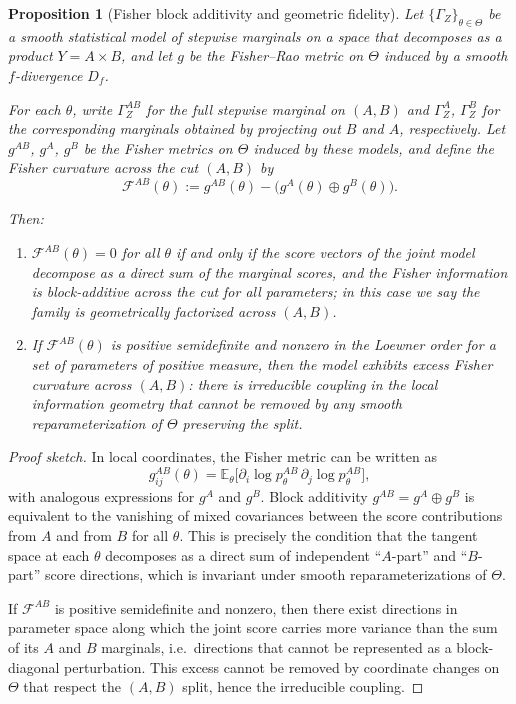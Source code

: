 \documentclass[11pt]{article}
\newtheorem{proposition}{Proposition}
\newcommand{\1}{\mathbf{1}}
\begin{document}
\begin{proposition}[Fisher block additivity and geometric fidelity]
\label{prop:fisher-block-additivity}
Let $\{\Gamma_Z\}_{\theta\in\Theta}$ be a smooth statistical model of stepwise marginals on a space that decomposes as a product $Y = A \times B$, and let $g$ be the Fisher--Rao metric on $\Theta$ induced by a smooth $f$-divergence $D_f$.

For each $\theta$, write $\Gamma_Z^{AB}$ for the full stepwise marginal on $(A,B)$ and $\Gamma_Z^A$, $\Gamma_Z^B$ for the corresponding marginals obtained by projecting out $B$ and $A$, respectively. Let $g^{AB}$, $g^A$, $g^B$ be the Fisher metrics on $\Theta$ induced by these models, and define the Fisher curvature across the cut $(A,B)$ by
\[
  \mathcal{F}^{AB}(\theta)
  := g^{AB}(\theta) - \bigl(g^A(\theta) \oplus g^B(\theta)\bigr).
\]

Then:
\begin{enumerate}[label=(\roman*),leftmargin=1.6em]
  \item $\mathcal{F}^{AB}(\theta) = 0$ for all $\theta$ if and only if the score
        vectors of the joint model decompose as a direct sum of the marginal scores,
        and the Fisher information is block-additive across the cut
        for all parameters; in this case we say the family is
        \emph{geometrically factorized across $(A,B)$}.

  \item If $\mathcal{F}^{AB}(\theta)$ is positive semidefinite and nonzero in the
        Loewner order for a set of parameters of positive measure, then the model
        exhibits \emph{excess Fisher curvature} across $(A,B)$:
        there is irreducible coupling in the local information geometry that cannot
        be removed by any smooth reparameterization of $\Theta$ preserving the split.
\end{enumerate}
\end{proposition}

\begin{proof}[Proof sketch]
In local coordinates, the Fisher metric can be written as
\[
  g^{AB}_{ij}(\theta)
  = \mathbb{E}_\theta\bigl[
      \partial_i \log p_\theta^{AB}
      \,\partial_j \log p_\theta^{AB}
    \bigr],
\]
with analogous expressions for $g^A$ and $g^B$. Block additivity $g^{AB} = g^A \oplus g^B$ is equivalent to the vanishing of mixed covariances between the score contributions from $A$ and from $B$ for all $\theta$. This is precisely the condition that the tangent space at each $\theta$ decomposes as a direct sum of independent ``$A$-part'' and ``$B$-part'' score directions, which is invariant under smooth reparameterizations of $\Theta$.

If $\mathcal{F}^{AB}$ is positive semidefinite and nonzero, then there exist directions in parameter space along which the joint score carries more variance than the sum of its $A$ and $B$ marginals, i.e.\ directions that cannot be represented as a block-diagonal perturbation. This excess cannot be removed by coordinate changes on $\Theta$ that respect the $(A,B)$ split, hence the irreducible coupling.
\end{proof}
\end{document}
